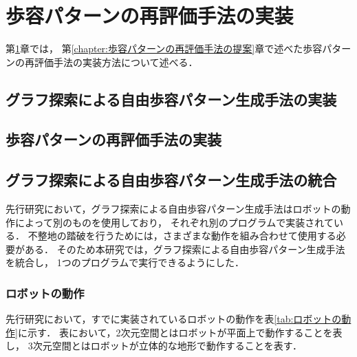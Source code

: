 ﻿%

\chapter{歩容パターンの再評価手法の実装}\label{chapter:歩容パターンの再評価手法の実装}
第\ref{chapter:歩容パターンの再評価手法の実装}章では，
第\ref{chapter:歩容パターンの再評価手法の提案}章で述べた歩容パターンの再評価手法の実装方法について述べる．

\section{グラフ探索による自由歩容パターン生成手法の実装}
\section{歩容パターンの再評価手法の実装}
\section{グラフ探索による自由歩容パターン生成手法の統合}
先行研究において，グラフ探索による自由歩容パターン生成手法はロボットの動作によって別のものを使用しており，
それぞれ別のプログラムで実装されている．
不整地の踏破を行うためには，さまざまな動作を組み合わせて使用する必要がある．
そのため本研究では，グラフ探索による自由歩容パターン生成手法を統合し，
1つのプログラムで実行できるようにした．

\subsection{ロボットの動作}
先行研究において，すでに実装されているロボットの動作を表\ref{tab:ロボットの動作}に示す．
表において，2次元空間とはロボットが平面上で動作することを表し，
3次元空間とはロボットが立体的な地形で動作することを表す．

